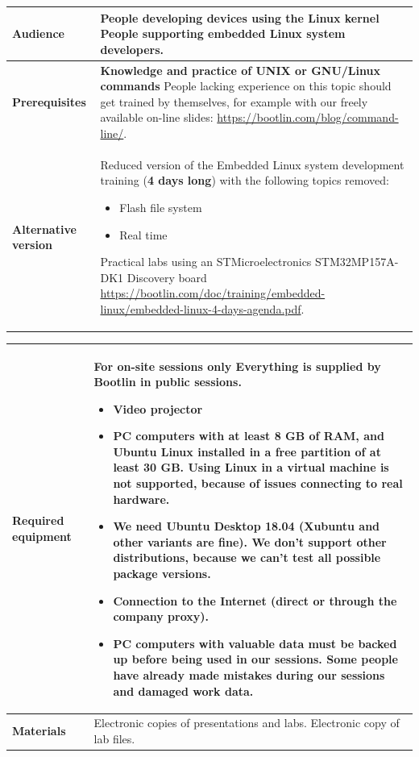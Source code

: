 \documentclass[a4paper,12pt,obeyspaces,spaces,hyphens]{article}
\begin{document}
{\begin{tabularx}{\textwidth}{|g|h|}
    {\bf Audience} & People developing devices using the Linux kernel
    \newline People supporting embedded Linux system developers. \\
    \hline

    {\bf Prerequisites} &
    {\bf Knowledge and practice of UNIX or GNU/Linux commands}
    \newline People lacking experience on this topic should get
    trained by themselves, for example with our freely available
    on-line slides:
    \newline \url{https://bootlin.com/blog/command-line/}. \\
    \hline

    {\bf Alternative version} & Reduced version of the Embedded Linux
    system development training ({\bf 4 days long}) with the following
    topics removed:
    \begin{itemize}
    \item Flash file system
    \item Real time
    \end{itemize}
    Practical labs using an STMicroelectronics STM32MP157A-DK1 Discovery board
    \url{https://bootlin.com/doc/training/embedded-linux/embedded-linux-4-days-agenda.pdf}. \\
    \hline

  \end{tabularx}

  \begin{tabularx}{\textwidth}{|g|h|}
    {\bf Required equipment} &
    {\bf For on-site sessions only}
    \newline Everything is supplied by Bootlin in public sessions.
    \begin{itemize}
    \item Video projector
    \item PC computers with at least 8 GB of RAM, and Ubuntu Linux
    installed in a {\bf free partition of at least 30 GB. Using Linux
      in a virtual machine is not supported}, because of issues
    connecting to real hardware.
    \item We need Ubuntu Desktop 18.04 (Xubuntu and
    other variants are fine). We don't support other
    distributions, because we can't test all possible package versions.
    \item {\bf Connection to the Internet} (direct or through the
    company proxy).
    \item {\bf PC computers with valuable data must be backed up}
    before being used in our sessions.  Some people have already made
    mistakes during our sessions and damaged work data.
    \end{itemize}\\
    \hline

    {\bf Materials} & Electronic copies of presentations and
    labs.
    \newline Electronic copy of lab files.\\
    \hline

\end{tabularx}}
\normalsize
\end{document}
